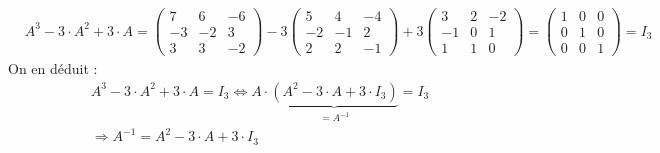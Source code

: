 {$$\begin{aligned}
		& A^3-3 \cdot A^2+3 \cdot A=\left(\begin{array}{ccc}
			7 & 6 & -6 \\
			-3 & -2 & 3 \\
			3 & 3 & -2
		\end{array}\right)-3\left(\begin{array}{ccc}
			5 & 4 & -4 \\
			-2 & -1 & 2 \\
			2 & 2 & -1
		\end{array}\right)+3\left(\begin{array}{ccc}
			3 & 2 & -2 \\
			-1 & 0 & 1 \\
			1 & 1 & 0
		\end{array}\right)=\left(\begin{array}{lll}
			1 & 0 & 0 \\
			0 & 1 & 0 \\
			0 & 0 & 1
		\end{array}\right)=I_3
	\end{aligned}
	$$
	On en déduit :
	$$
	\begin{gathered}
		A^3-3 \cdot A^2+3 \cdot A=I_3 \Leftrightarrow A \cdot \underbrace{\left(A^2-3 \cdot A+3 \cdot I_3\right)}_{=A^{-1}}=I_3 \\
		\Rightarrow A^{-1}=A^2-3 \cdot A+3 \cdot I_3
	\end{gathered}
	$$ }